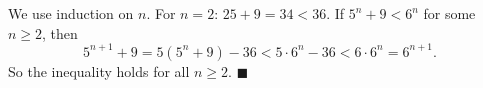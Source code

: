 We use induction on $n$. For $n=2$: $25+9=34<36$. If $5^n+9<6^n$ for some $n\ge2$, then
\[5^{n+1}+9=5\left(5^n+9\right)-36<5\cdot6^n-36<6\cdot6^n=6^{n+1}.\]
So the inequality holds for all $n\ge2$. $\blacksquare$
